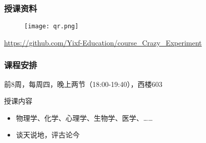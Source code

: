 \begin{frame}
  \frametitle{授课资料}
  \begin{figure}
    \centering
    \texttt{[image: qr.png]}
  \end{figure}
  \begin{center}
  \href{https://github.com/Yixf-Education/course_Crazy_Experiment}{https://github.com/Yixf-Education/course\_Crazy\_Experiment}
  \end{center}
\end{frame}



\begin{frame}
  \frametitle{课程安排}
  \begin{center}
  \alert{前8周，每周四，晚上两节（18:00-19:40），西楼603}\\
  \vspace{0.2cm}
  \end{center}
  \begin{block}{授课内容}
    \begin{itemize}
      \item 物理学、化学、心理学、生物学、医学、……
      \item 谈天说地，评古论今
    \end{itemize}
  \end{block}
\end{frame}

